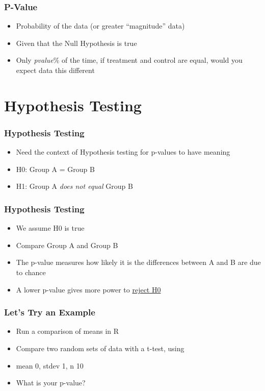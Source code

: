 \documentclass[14pt,handout]{beamer}
\begin{document}
\begin{frame}
\frametitle{P-Value}
\begin{itemize}
	\item<+-> Probability of the data (or greater ``magnitude'' data)
	\item<+-> Given that the Null Hypothesis is true
	\item<+-> Only \textit{pvalue}\% of the time, if treatment and control are equal, would you expect data this different
\end{itemize}
\end{frame}

\section{Hypothesis Testing}

\begin{frame}
\frametitle{Hypothesis Testing}
\begin{itemize}
	\item<+-> Need the context of Hypothesis testing for p-values to have meaning
	\item<+-> H0: Group A = Group B
	\item<+-> H1: Group A \textit{does not equal} Group B
\end{itemize}
\end{frame}

\begin{frame}
\frametitle{Hypothesis Testing}
\begin{itemize}
	\item<+-> We assume H0 is true
	\item<+-> Compare Group A and Group B
	\item<+-> The p-value measures how likely it is the differences between A and B are due to chance
	\item<+-> A lower p-value gives more power to \underline{reject H0}
\end{itemize}
\end{frame}

\begin{frame}
\frametitle{Let's Try an Example}
\begin{itemize}
	\item Run a comparison of means in R
	\item Compare two random sets of data with a t-test, using
	\ttfamily
	\footnotesize
	\normalsize
	\sffamily
	\item mean 0, stdev 1, n 10
	\item What is your p-value?
\end{itemize}
\end{frame}
\end{document}
